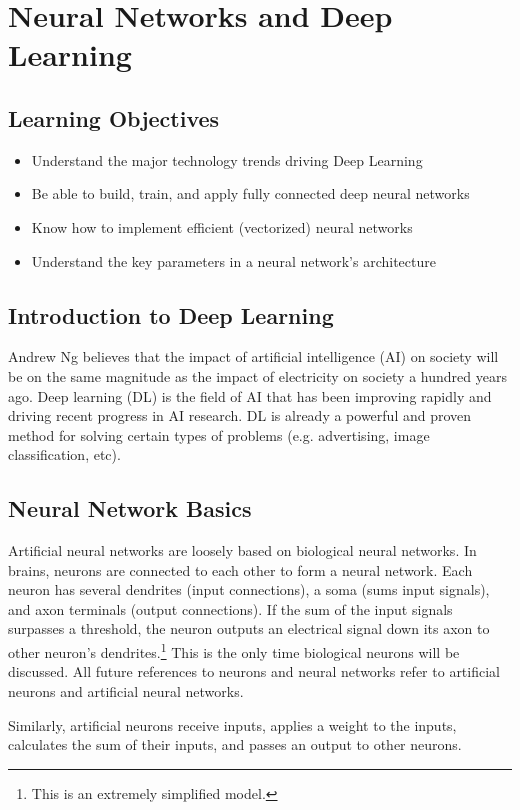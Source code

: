 \chapter{Neural Networks and Deep Learning}
\section*{Learning Objectives}
\begin{itemize}
  \item Understand the major technology trends driving Deep Learning
  \item Be able to build, train, and apply fully connected deep neural networks
  \item Know how to implement efficient (vectorized) neural networks
  \item Understand the key parameters in a neural network's architecture
\end{itemize}

\section{Introduction to Deep Learning}
Andrew Ng believes that the impact of artificial intelligence (AI) on society will be on the same magnitude as the impact of electricity on society a hundred years ago. Deep learning (DL) is the field of AI that has been improving rapidly and driving recent progress in AI research. DL is already a powerful and proven method for solving certain types of problems (e.g. advertising, image classification, etc). 


\section{Neural Network Basics}
Artificial neural networks are loosely based on biological neural networks. In brains, neurons are connected to each other to form a neural network. Each neuron has several dendrites (input connections), a soma (sums input signals), and axon terminals (output connections). If the sum of the input signals surpasses a threshold, the neuron outputs an electrical signal down its axon to other neuron's dendrites.\footnote{This is an extremely simplified model.} This is the only time biological neurons will be discussed. All future references to neurons and neural networks refer to artificial neurons and artificial neural networks.

Similarly, artificial neurons receive inputs, applies a weight to the inputs, calculates the sum of their inputs, and passes an output to other neurons.

